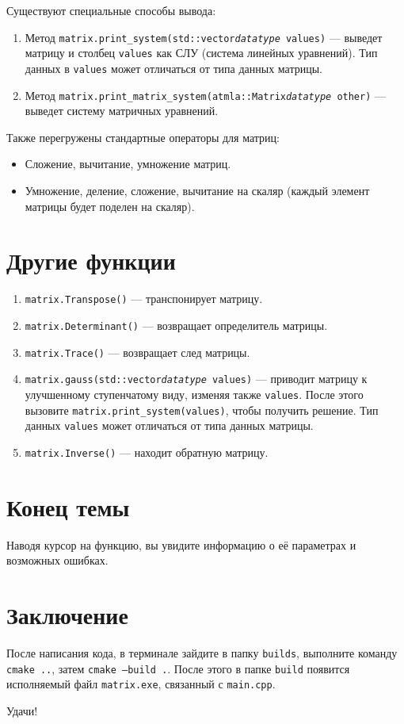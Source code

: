 \documentclass{article}
\begin{document}
Существуют специальные способы вывода:
\begin{enumerate}
    \item Метод \texttt{matrix.print\_system(std::vector{\textit{datatype}} values)} — выведет матрицу и столбец \texttt{values} как СЛУ (система линейных уравнений). Тип данных в \texttt{values} может отличаться от типа данных матрицы.
    \item Метод \texttt{matrix.print\_matrix\_system(atmla::Matrix{\textit{datatype}} other)} — выведет систему матричных уравнений.
\end{enumerate}

Также перегружены стандартные операторы для матриц:
\begin{itemize}
    \item Сложение, вычитание, умножение матриц.
    \item Умножение, деление, сложение, вычитание на скаляр (каждый элемент матрицы будет поделен на скаляр).
\end{itemize}

\section{Другие функции}
\begin{enumerate}
    \item \texttt{matrix.Transpose()} — транспонирует матрицу.
    \item \texttt{matrix.Determinant()} — возвращает определитель матрицы.
    \item \texttt{matrix.Trace()} — возвращает след матрицы.
    \item \texttt{matrix.gauss(std::vector{\textit{datatype}} values)} — приводит матрицу к улучшенному ступенчатому виду, изменяя также \texttt{values}. После этого вызовите \texttt{matrix.print\_system(values)}, чтобы получить решение. Тип данных \texttt{values} может отличаться от типа данных матрицы.
    \item \texttt{matrix.Inverse()} — находит обратную матрицу.
\end{enumerate}

\section{Конец темы}
Наводя курсор на функцию, вы увидите информацию о её параметрах и возможных ошибках.

\section{Заключение}
После написания кода, в терминале зайдите в папку \texttt{builds}, выполните команду \texttt{cmake ..}, затем \texttt{cmake --build .}. После этого в папке \texttt{build} появится исполняемый файл \texttt{matrix.exe}, связанный с \texttt{main.cpp}.

Удачи!
\end{document}
